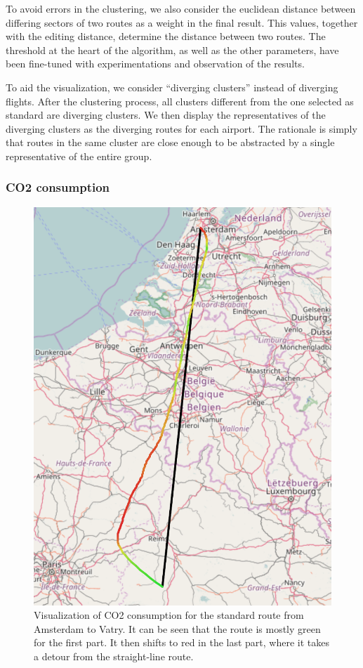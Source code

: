 \documentclass{vldb}
\begin{document}
To avoid errors in the clustering, we also consider the euclidean distance
between differing sectors of two routes as a weight in the final result. This
values, together with the editing distance, determine the distance between two
routes. The threshold at the heart of the algorithm, as well as the other
parameters, have been fine-tuned with experimentations and
observation of the results.

To aid the visualization, we consider ``diverging clusters'' instead of
diverging flights. After the clustering process, all clusters different from the
one selected as standard are diverging clusters. We then display the
representatives of the diverging clusters as the diverging routes for each
airport. The rationale is simply that routes in the same cluster are close
enough to be abstracted by a single representative of the entire group.

\subsubsection{CO2 consumption}

\begin{figure}[t]
  \centering
  \includegraphics[scale=0.4]{imgs/amsterdam-vatry-co2.png}
  \caption{Visualization of CO2 consumption for the standard route from
    Amsterdam to Vatry. It can be seen that the route is mostly green for the
    first part. It then shifts to red in the last part, where it takes a detour
    from the straight-line route.}
  \label{fig:amsterdam-vatry}
\end{figure}
\end{document}
